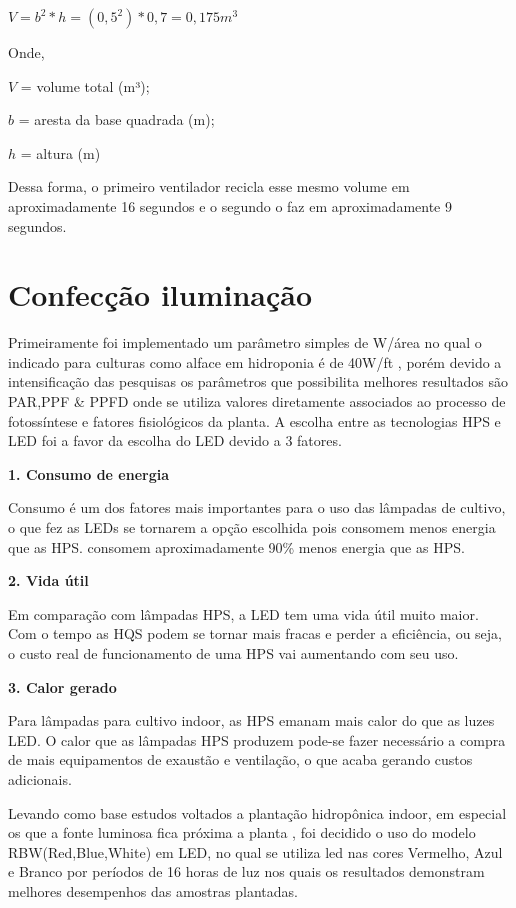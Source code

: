 \begin{center}
	\large
	${\displaystyle V = b^2 * h = (0,5^2) * 0,7 = 0,175 m^3}$
\end{center}

Onde,

$V$ = volume total (m³);

$b$ = aresta da base quadrada (m);

$h$ = altura (m)

Dessa forma, o primeiro ventilador recicla esse mesmo volume em aproximadamente 16 segundos e o segundo o faz em aproximadamente 9 segundos.  

\section{Confecção iluminação}

Primeiramente foi implementado um parâmetro simples de W/área no qual o indicado para culturas como alface em hidroponia é de 40W/ft , porém devido a intensificação das pesquisas os parâmetros que possibilita melhores resultados são  PAR,PPF \& PPFD onde se utiliza valores diretamente associados ao processo de fotossíntese e fatores fisiológicos da planta.
A escolha entre as tecnologias HPS e LED foi a favor da escolha do LED devido a 3 fatores.

\textbf{1. Consumo de energia}

Consumo é um dos fatores mais importantes para o uso das lâmpadas de cultivo, o que fez as LEDs se tornarem a opção escolhida pois consomem menos energia que as HPS. consomem aproximadamente 90\% menos energia que as HPS.

\textbf{2. Vida útil}

Em comparação com lâmpadas HPS, a LED tem uma vida útil muito maior. Com o tempo as HQS podem se tornar mais fracas e perder a eficiência, ou seja, o custo real de funcionamento de uma HPS vai aumentando com seu uso.

\textbf{3. Calor gerado}

Para lâmpadas para cultivo indoor, as HPS emanam mais calor do que as luzes LED. O calor que as lâmpadas HPS produzem pode-se fazer necessário a compra de mais equipamentos de exaustão e ventilação, o que acaba gerando custos adicionais.

Levando como base estudos voltados a plantação hidropônica indoor, em especial os que a fonte luminosa fica próxima a planta , foi decidido o uso do modelo RBW(Red,Blue,White) em LED, no qual se utiliza led nas cores Vermelho, Azul e Branco por períodos de 16 horas de luz  nos quais os resultados demonstram melhores desempenhos das amostras plantadas. 

